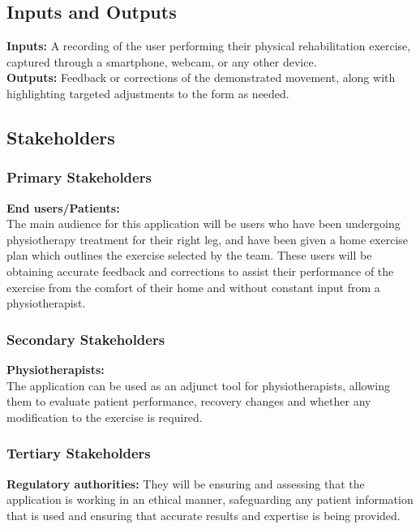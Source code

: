 \documentclass{article}
\begin{document}
\subsection{Inputs and Outputs}

\textbf{Inputs:} A recording of the user performing their physical rehabilitation exercise, captured through a smartphone, webcam, or any other device. \\
\textbf{Outputs:} Feedback or corrections of the demonstrated movement, along with highlighting targeted adjustments to the form as needed. 

\subsection{Stakeholders}
  \subsubsection{Primary Stakeholders}
    \textbf{End users/Patients:} \\
      The main audience for this application will be users who have been undergoing physiotherapy treatment for their right leg, and have been given a home exercise plan which outlines the exercise selected by the team. 
      These users will be obtaining accurate feedback and corrections to assist their performance of the exercise from the comfort of their home and without constant input from a physiotherapist.
     
  \subsubsection{Secondary Stakeholders}
    \textbf{Physiotherapists:} \\
      The application can be used as an adjunct tool for physiotherapists, allowing them to evaluate patient performance, recovery changes and whether any modification to the exercise is required. \\
      
  \subsubsection{Tertiary Stakeholders}
    \textbf{Regulatory authorities:}
      They will be ensuring and assessing that the application is working in an ethical manner, safeguarding any patient information that is used and ensuring that accurate results and expertise is being provided. \\
      
\end{document}
